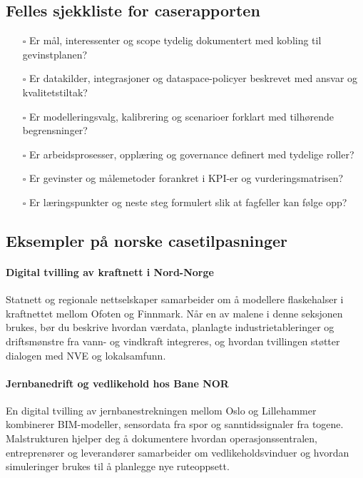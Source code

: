\subsection*{Felles sjekkliste for caserapporten}
\begin{itemize}
    \item[$\square$] Er mål, interessenter og scope tydelig dokumentert med kobling til gevinstplanen?
    \item[$\square$] Er datakilder, integrasjoner og dataspace-policyer beskrevet med ansvar og kvalitetstiltak?
    \item[$\square$] Er modelleringsvalg, kalibrering og scenarioer forklart med tilhørende begrensninger?
    \item[$\square$] Er arbeidsprosesser, opplæring og governance definert med tydelige roller?
    \item[$\square$] Er gevinster og målemetoder forankret i KPI-er og vurderingsmatrisen?
    \item[$\square$] Er læringspunkter og neste steg formulert slik at fagfeller kan følge opp?
\end{itemize}

\subsection*{Eksempler på norske casetilpasninger}
\paragraph{Digital tvilling av kraftnett i Nord-Norge}
Statnett og regionale nettselskaper samarbeider om å modellere flaskehalser i kraftnettet mellom Ofoten og Finnmark. Når en av malene i denne seksjonen brukes, bør du beskrive hvordan værdata, planlagte industrietableringer og driftsmønstre fra vann- og vindkraft integreres, og hvordan tvillingen støtter dialogen med NVE og lokalsamfunn.

\paragraph{Jernbanedrift og vedlikehold hos Bane NOR}
En digital tvilling av jernbanestrekningen mellom Oslo og Lillehammer kombinerer BIM-modeller, sensordata fra spor og sanntidssignaler fra togene. Malstrukturen hjelper deg å dokumentere hvordan operasjonssentralen, entreprenører og leverandører samarbeider om vedlikeholdsvinduer og hvordan simuleringer brukes til å planlegge nye ruteoppsett.

